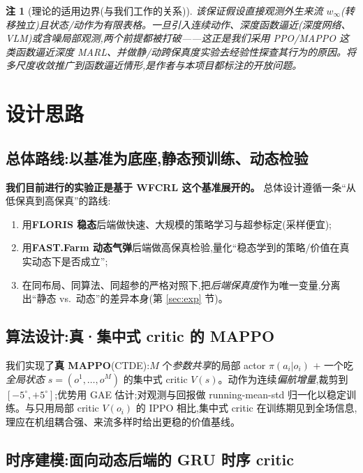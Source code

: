 \documentclass[12pt,a4paper]{article}
\theoremstyle{definition}
\theoremstyle{plain}
\newtheorem{remark}{注}
\begin{document}
\begin{remark}[理论的适用边界(与我们工作的关系)]
该保证假设\emph{直接观测}外生来流 $w_\infty$(转移独立)且状态/动作为\emph{有限表格}。一旦引入连续动作、深度函数逼近(深度网络、VLM)或含噪局部观测,两个前提都被打破——这正是我们采用 PPO/MAPPO 这类\emph{函数逼近}深度 MARL、并做\emph{静/动跨保真度}实验去经验性探查其行为的原因。将多尺度收敛推广到函数逼近情形,是作者与本项目都标注的开放问题。
\end{remark}

\section{设计思路}

\subsection{总体路线:以基准为底座,静态预训练、动态检验}

\textbf{我们目前进行的实验正是基于 WFCRL 这个基准展开的。} 总体设计遵循一条“从低保真到高保真”的路线:
\begin{enumerate}[leftmargin=1.6em,itemsep=2pt]
  \item 用\textbf{FLORIS 稳态}后端做快速、大规模的策略学习与超参标定(采样便宜);
  \item 用\textbf{FAST.Farm 动态气弹}后端做高保真检验,量化“稳态学到的策略/价值在真实动态下是否成立”;
  \item 在同布局、同算法、同超参的严格对照下,把\emph{后端保真度}作为唯一变量,分离出“静态 vs.\ 动态”的差异本身(第 \ref{sec:exp} 节)。
\end{enumerate}

\subsection{算法设计:真·集中式 critic 的 MAPPO}

我们实现了\textbf{真 MAPPO}(CTDE):$M$ 个\emph{参数共享}的局部 actor $\pi(a_i|o_i)$ $+$ 一个吃\emph{全局状态} $s=(o^1,\dots,o^M)$ 的集中式 critic $V(s)$。动作为连续\emph{偏航增量},裁剪到 $[-5^\circ,+5^\circ]$;优势用 GAE 估计;对观测与回报做 running-mean-std 归一化以稳定训练。与只用局部 critic $V(o_i)$ 的 IPPO 相比,集中式 critic 在训练期见到全场信息,理应在机组耦合强、来流多样时给出更稳的价值基线。

\subsection{时序建模:面向动态后端的 GRU 时序 critic}
\end{document}
